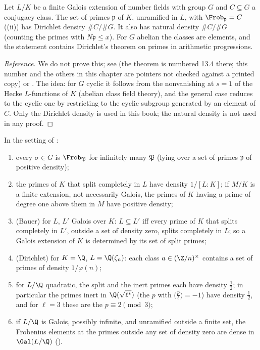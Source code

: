 \begin{theorem}\label{thm:ant:chebotarev}
Let $L/K$ be a finite Galois extension of number fields with group $G$ and $C\subseteq G$ a conjugacy class. The set of primes $\mathfrak p$ of $K$, unramified in
$L$, with $\Frob_{\mathfrak p}=C$ ((ii)) has Dirichlet density $\#C/\#G$. It also has natural density $\#C/\#G$ (counting the primes with
$N\mathfrak p\le x$). For $G$ abelian the classes are elements, and the statement contains Dirichlet's theorem on primes in arithmetic progressions.
\end{theorem}

\begin{proof}[Reference]
We do not prove this; see \cite[Chapter VII, Section 13]{Neukirch} (the theorem is numbered 13.4 there; this number and the others in this chapter are
pointers not checked against a printed copy) or \cite[Chapter I, Section 2.2]{SerreAbelian}. The idea: for $G$ cyclic it follows from the nonvanishing
at $s=1$ of the Hecke $L$-functions of $K$ (abelian class field theory), and the general case reduces to the cyclic one by restricting to the cyclic
subgroup generated by an element of $C$. Only the Dirichlet density is used in this book; the natural density is not used in any proof.
\end{proof}

\begin{corollary}\label{cor:ant:chebotarev}
In the setting of :
\begin{enumerate}[label=(\roman*)]
\item every $\sigma\in G$ is $\Frob_{\mathfrak P}$ for infinitely many $\mathfrak P$ (lying over a set of primes $\mathfrak p$ of positive density);
\item the primes of $K$ that split completely in $L$ have density $1/[L:K]$; if $M/K$ is a finite extension, not necessarily Galois, the primes of $K$ having
a prime of degree one above them in $M$ have positive density;
\item (Bauer) for $L$, $L'$ Galois over $K$: $L\subseteq L'$ iff every prime of $K$ that splits completely in $L'$, outside a set of density zero, splits
completely in $L$; so a Galois extension of $K$ is determined by its set of split primes;
\item (Dirichlet) for $K=\Q$, $L=\Q(\zeta_n)$: each class $a\in(\Z/n)^\times$ contains a set of primes of density $1/\varphi(n)$;
\item for $L/\Q$ quadratic, the split and the inert primes each have density $\frac12$; in particular the primes inert in $\Q(\sqrt{\ell^*})$ (the $p$ with
$\bigl(\frac p\ell\bigr)=-1$) have density $\frac12$, and for $\ell=3$ these are the $p\equiv2\pmod3$;
\item if $L/\Q$ is Galois, possibly infinite, and unramified outside a finite set, the Frobenius elements at the primes outside any set of density zero are
dense in $\Gal(L/\Q)$ ().
\end{enumerate}
\end{corollary}

